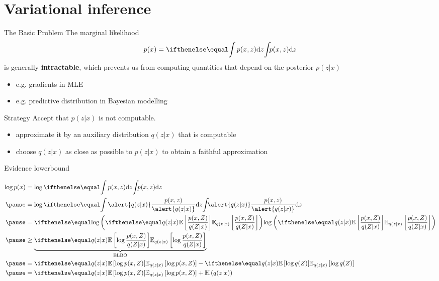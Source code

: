 \section{Variational inference}

\begin{frame}{The Basic Problem}
The marginal likelihood
$$ p(x) = \intl{ p(x,z) }{z} $$
is generally \textbf{intractable},  which prevents us from computing quantities that depend on the posterior $p(z|x)$

\begin{itemize}
	\item e.g. gradients in MLE
	\item e.g. predictive distribution in Bayesian modelling
\end{itemize}

\end{frame}


\begin{frame}{Strategy}
Accept that $ p(z|x) $ is not computable.
\pause
\begin{itemize}
	\item approximate it by an auxiliary distribution $ q(z|x) $ that is computable
	\item choose $ q(z|x) $ as close as possible to $ p(z|x) $ to obtain a faithful approximation
\end{itemize}

\end{frame}



\begin{frame}{Evidence lowerbound}

\begin{small}
\begin{equation*}
\begin{aligned}
\log p(x) &= \log \intl{p(x,z)}{z} \\
\pause
&= \log \intl{\alert{q(z|x)}\frac{p(x,z)}{\alert{q(z|x)}}}{z} \\
\pause
&= \loga{\E[q(z|x)]{\frac{p(x,Z)}{{q(Z|x)}}}} \\ \pause
&\geq \underbrace{\E[q(z|x)]{  \log{\frac{p(x,Z)}{{q(Z|x)}}}}}_{\text{ELBO}} \\
\pause
&= \E[q(z|x)]{ \log p(x, Z)} - \E[q(z|x)]{\log q(Z)}\\
\pause
& = \E[q(z|x)] {\log p(x, Z)} + \Ent{q(z|x)}
\end{aligned}
\end{equation*}
\end{small}
\end{frame}

